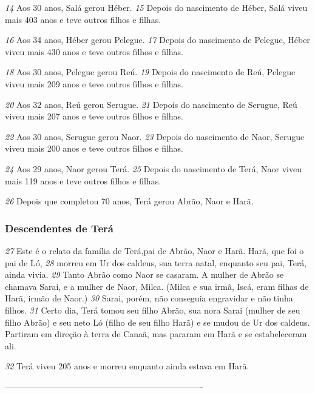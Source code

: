 \bigskip
\textit{\tiny 14}
 Aos 30 anos, Salá gerou Héber. 
\textit{\tiny 15}
 Depois do nascimento de Héber, Salá viveu mais 403 anos e teve outros filhos e filhas.



\bigskip
\textit{\tiny 16}
 Aos 34 anos, Héber gerou Pelegue. 
\textit{\tiny 17}
 Depois do nascimento de Pelegue, Héber viveu mais 430 anos e teve outros filhos e filhas.


\bigskip
\textit{\tiny 18}
 Aos 30 anos, Pelegue gerou Reú. 
\textit{\tiny 19}
 Depois do nascimento de Reú, Pelegue viveu mais 209 anos e teve outros filhos e filhas.


\bigskip
\textit{\tiny 20}
 Aos 32 anos, Reú gerou Serugue. 
\textit{\tiny 21}
 Depois do nascimento de Serugue, Reú viveu mais 207 anos e teve outros filhos e filhas.


\bigskip
\textit{\tiny 22}
 Aos 30 anos, Serugue gerou Naor. 
\textit{\tiny 23}
 Depois do nascimento de Naor, Serugue viveu mais 200 anos e teve outros filhos e filhas.


\bigskip
\textit{\tiny 24}
 Aos 29 anos, Naor gerou Terá. 
\textit{\tiny 25}
 Depois do nascimento de Terá, Naor viveu mais 119 anos e teve outros filhos e filhas.


\bigskip
\textit{\tiny 26}
 Depois que completou 70 anos, Terá gerou Abrão, Naor e Harã.



\bigskip
\subsubsection*{Descendentes de Terá}


\textit{\tiny 27}
 Este é o relato da família de Terá,pai de Abrão, Naor e Harã. Harã, que foi o pai de Ló, 
\textit{\tiny 28}
 morreu em Ur dos caldeus, sua terra natal, enquanto seu pai, Terá, ainda vivia. 
\textit{\tiny 29}
 Tanto Abrão como Naor se casaram. A mulher de Abrão se chamava Sarai, e a mulher de Naor, Milca. (Milca e sua irmã, Iscá, eram filhas de Harã, irmão de Naor.) 
\textit{\tiny 30}
 Sarai, porém, não conseguia engravidar e não tinha filhos. 
\textit{\tiny 31}
 Certo dia, Terá tomou seu filho Abrão, sua nora Sarai (mulher de seu filho Abrão) e seu neto Ló (filho de seu filho Harã) e se mudou de Ur dos caldeus. Partiram em direção à terra de Canaã, mas pararam em Harã e se estabeleceram ali.


\bigskip
\textit{\tiny 32}
Terá viveu 205 anos e morreu enquanto ainda estava em Harã.

----------------------------------------------------------------------

